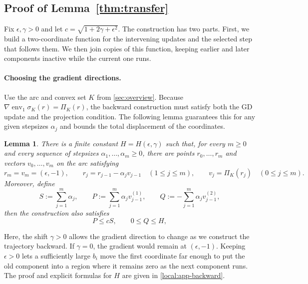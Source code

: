 \documentclass[11pt,letterpaper]{article}
\newtheorem{lemma}[lemma]{Lemma}
\theoremstyle{definition}
\begin{document}
\subsection{Proof of Lemma~\ref{thm:transfer}}
\label{sec:local}

Fix $\epsilon,\gamma>0$ and let $c=\sqrt{1+2\gamma+\epsilon^2}$.
The construction has two parts.
First, we build a two-coordinate function for the intervening updates and the selected step that follows them.
We then join copies of this function, keeping earlier and later components inactive while the current one runs.

\paragraph{Choosing the gradient directions.}
Use the arc and convex set $K$ from \cref{sec:overview}.
Because $\nabla\operatorname{env}_1\sigma_K(r)=\Pi_K(r)$, the backward construction must satisfy both the GD update and the projection condition.
The following lemma guarantees this for any given stepsizes $\alpha_j$ and bounds the total displacement of the coordinates.

\begin{lemma}
\label{lem:local-backward}
There is a finite constant $H=H(\epsilon,\gamma)$ such that, for every $m\ge0$ and every sequence of stepsizes $\alpha_1,\ldots,\alpha_m\ge0$, there are points $r_0,\ldots,r_m$ and vectors $v_0,\ldots,v_m$ on the arc satisfying
\[
  r_m=v_m=(\epsilon,-1),\qquad
  r_j=r_{j-1}-\alpha_jv_{j-1}\quad(1\le j\le m),
  \qquad v_j=\Pi_K(r_j)\quad(0\le j\le m).
\]
Moreover, define
\begin{equation}
  S:=\sum_{j=1}^m\alpha_j,\qquad
  P:=\sum_{j=1}^m\alpha_j v_{j-1}^{(1)},\qquad
  Q:=-\sum_{j=1}^m\alpha_jv_{j-1}^{(2)},
  \label{local:displacement-constants}
\end{equation}
then the construction also satisfies
\begin{equation}
P\le cS,\qquad
    0\le Q \le H,
  \label{local:displacement-bounds}
\end{equation}
\end{lemma}

Here, the shift $\gamma>0$ allows the gradient direction to change as we construct the trajectory backward.
If $\gamma=0$, the gradient would remain at $(\epsilon,-1)$.
Keeping $\epsilon>0$ lets a sufficiently large $b_i$ move the first coordinate far enough to put the old component into a region where it remains zero as the next component runs.
The proof and explicit formulas for $H$ are given in \cref{local:app-backward}.
\end{document}
